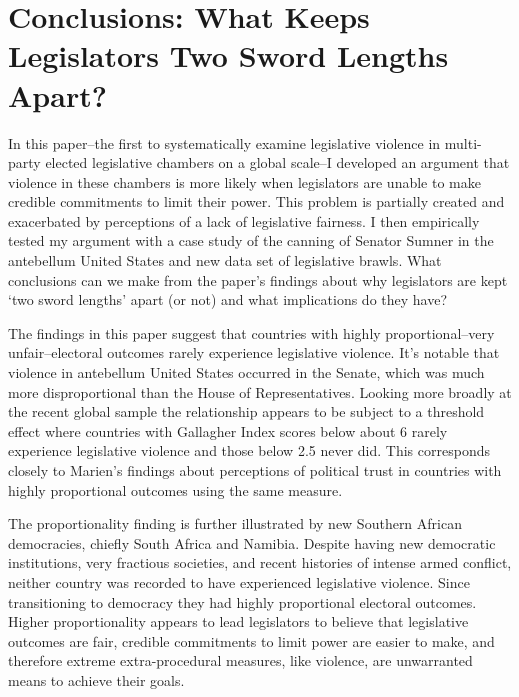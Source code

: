 \documentclass[a4paper]{article}\usepackage[]{graphicx}\usepackage[]{color}
\begin{document}
\section*{Conclusions: What Keeps Legislators Two Sword Lengths Apart?}

In this paper--the first to systematically examine legislative violence in multi-party elected legislative chambers on a global scale--I developed an argument that violence in these chambers is more likely when legislators are unable to make credible commitments to limit their power. This problem is partially created and exacerbated by perceptions of a lack of legislative fairness. I then empirically tested my argument with a case study of the canning of Senator Sumner in the antebellum United States and new data set of legislative brawls. What conclusions can we make from the paper's findings about why legislators are kept `two sword lengths' apart (or not) and what implications do they have?

The findings in this paper suggest that countries with highly proportional--very unfair--electoral outcomes rarely experience legislative violence. It's notable that violence in antebellum United States occurred in the Senate, which was much more disproportional than the House of Representatives. Looking more broadly at the recent global sample the relationship appears to be subject to a threshold effect where countries with Gallagher Index scores below about 6 rarely experience legislative violence and those below 2.5 never did. This corresponds closely to Marien's \citeyearpar{Marien2011} findings about perceptions of political trust in countries with highly proportional outcomes using the same measure. 

The proportionality finding is further illustrated by new Southern African democracies, chiefly South Africa and Namibia. Despite having new democratic institutions, very fractious societies, and recent histories of intense armed conflict, neither country was recorded to have experienced legislative violence. Since transitioning to democracy they had highly proportional electoral outcomes. Higher proportionality appears to lead legislators to believe that legislative outcomes are fair, credible commitments to limit power are easier to make, and therefore extreme extra-procedural measures, like violence, are unwarranted means to achieve their goals.    
\end{document}

